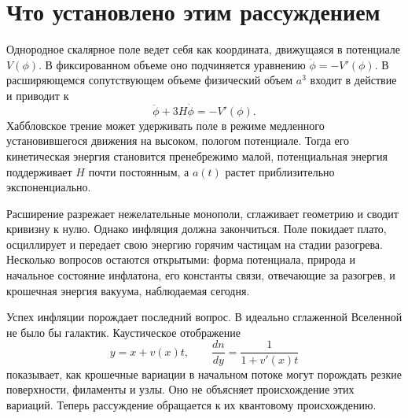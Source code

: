 \section{Что установлено этим рассуждением}

Однородное скалярное поле ведет себя как координата, движущаяся в потенциале \(V(\phi)\). В фиксированном объеме оно подчиняется уравнению \(\ddot\phi=-V'(\phi)\). В расширяющемся сопутствующем объеме физический объем \(a^3\) входит в действие и приводит к
\[
\ddot\phi+3H\dot\phi=-V'(\phi).
\]
Хаббловское трение может удерживать поле в режиме медленного установившегося движения на высоком, пологом потенциале. Тогда его кинетическая энергия становится пренебрежимо малой, потенциальная энергия поддерживает \(H\) почти постоянным, а \(a(t)\) растет приблизительно экспоненциально.

Расширение разрежает нежелательные монополи, сглаживает геометрию и сводит кривизну к нулю. Однако инфляция должна закончиться. Поле покидает плато, осциллирует и передает свою энергию горячим частицам на стадии разогрева. Несколько вопросов остаются открытыми: форма потенциала, природа и начальное состояние инфлатона, его константы связи, отвечающие за разогрев, и крошечная энергия вакуума, наблюдаемая сегодня.

Успех инфляции порождает последний вопрос. В идеально сглаженной Вселенной не было бы галактик. Каустическое отображение
\[
y=x+v(x)t,
\qquad
\frac{dn}{dy}=\frac{1}{1+v'(x)t}
\]
показывает, как крошечные вариации в начальном потоке могут порождать резкие поверхности, филаменты и узлы. Оно не объясняет происхождение этих вариаций. Теперь рассуждение обращается к их квантовому происхождению.
